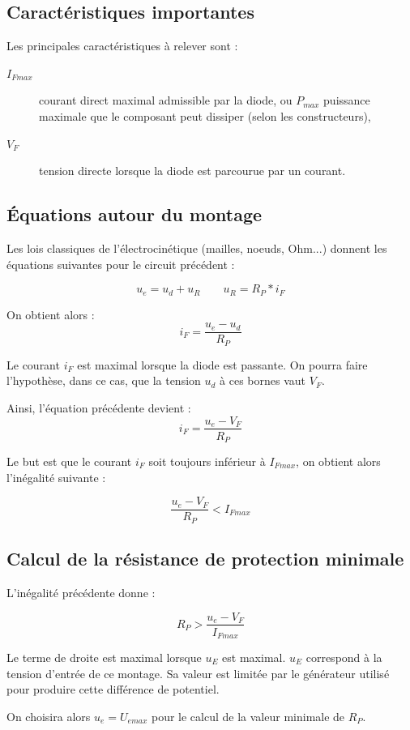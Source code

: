 \subsection{Caractéristiques importantes}

Les principales caractéristiques à relever sont : 

\begin{description}
	\item[$I_{Fmax}$] courant direct maximal admissible par la diode, ou $P_{max}$ puissance maximale que le composant peut dissiper (selon les constructeurs),
	\item[$V_F$] tension directe lorsque la diode est parcourue par un courant.
\end{description}

\subsection{Équations autour du montage}

Les lois classiques de l'électrocinétique (mailles, noeuds, Ohm...) donnent les équations suivantes pour le circuit précédent :

$$u_e = u_d + u_R \qquad u_R = R_P * i_F$$

On obtient alors : $$i_F = \frac{u_e - u_d}{R_P}$$

Le courant $i_F$ est maximal lorsque la diode est passante. On pourra faire l'hypothèse, dans ce cas, que la tension $u_d$ à ces bornes vaut $V_F$.

Ainsi, l'équation précédente devient : $$i_F = \frac{u_e - V_F}{R_P}$$

Le but est que le courant $i_F$ soit toujours inférieur à $I_{Fmax}$, on obtient alors l'inégalité suivante :

$$\boxed{\frac{u_e - V_F}{R_P} < I_{Fmax}}$$

\subsection{Calcul de la résistance de protection minimale}

L'inégalité précédente donne : 

$$R_P > \frac{u_e - V_F}{I_{Fmax}}$$

Le terme de droite est maximal lorsque $u_E$ est maximal. $u_E$ correspond à la tension d'entrée de ce montage. Sa valeur est limitée par le générateur utilisé pour produire cette différence de potentiel.

On choisira alors $u_e = U_{emax}$ pour le calcul de la valeur minimale de $R_P$.

